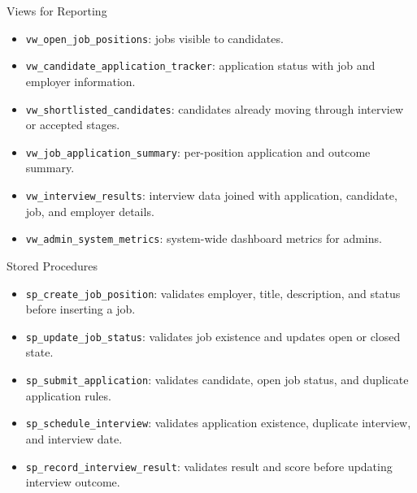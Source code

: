 \documentclass[aspectratio=169]{beamer}
\begin{document}
\begin{frame}{Views for Reporting}
  \begin{itemize}
    \item \texttt{vw\_open\_job\_positions}: jobs visible to candidates.
    \item \texttt{vw\_candidate\_application\_tracker}: application status with job and employer information.
    \item \texttt{vw\_shortlisted\_candidates}: candidates already moving through interview or accepted stages.
    \item \texttt{vw\_job\_application\_summary}: per-position application and outcome summary.
    \item \texttt{vw\_interview\_results}: interview data joined with application, candidate, job, and employer details.
    \item \texttt{vw\_admin\_system\_metrics}: system-wide dashboard metrics for admins.
  \end{itemize}
\end{frame}

\begin{frame}{Stored Procedures}
  \begin{itemize}
    \item \texttt{sp\_create\_job\_position}: validates employer, title, description, and status before inserting a job.
    \item \texttt{sp\_update\_job\_status}: validates job existence and updates open or closed state.
    \item \texttt{sp\_submit\_application}: validates candidate, open job status, and duplicate application rules.
    \item \texttt{sp\_schedule\_interview}: validates application existence, duplicate interview, and interview date.
    \item \texttt{sp\_record\_interview\_result}: validates result and score before updating interview outcome.
  \end{itemize}
\end{frame}
\end{document}
